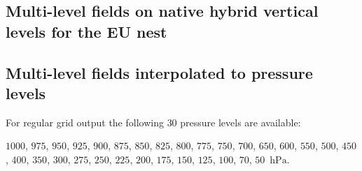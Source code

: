 \newpage 
\subsection{Multi-level fields on native hybrid vertical levels for the EU nest}

\renewcommand{\onlyglb}[1]{}
\renewcommand{\onlyloc}[1]{#1}
%
\begin{vartable}{}
  
  
  
\end{vartable}


\newpage 
\subsection{Multi-level fields interpolated to pressure levels}

\renewcommand{\new}[1]{\textcolor{red}{#1}}
%
%
\renewcommand{\pressurelevelsRegular}{$1000$, $975$, $950$, $925$, $900$, 
                                    $875$, $850$, $825$, $800$, 
                                    $775$, $750$, $700$, $650$, $600$, $550$, 
                                    $500$, $450$, $400$, $350$, $300$, $275$, 
                                    $250$, $225$, $200$, $175$, $150$, $125$, 
                                    $100$, $70$, $50$~$\mathrm{hPa}$}

For regular grid output the following $30$ pressure levels are available: 
\begin{center}
\begin{minipage}{0.5\linewidth}
\pressurelevelsRegular. 
\end{minipage}
\end{center}
 
